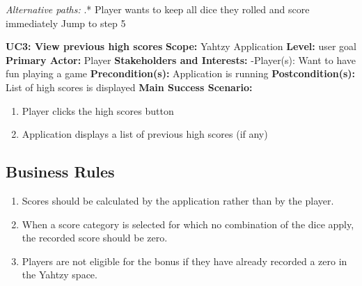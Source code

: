 \documentclass[12pt]{article}
\begin{document}
\begin{list}{}{}
\textit{Alternative paths:} \newline
{}.* Player wants to keep all dice they rolled and score immediately \newline
{} Jump to step 5 \newline

\newpage
\item \textbf{UC3: View previous high scores} \newline
\textbf{Scope:} Yahtzy Application \newline
\textbf{Level:} user goal \newline
\textbf{Primary Actor:} Player \newline
\textbf{Stakeholders and Interests:} \newline
\indent -Player(s): Want to have fun playing a game \newline
\textbf{Precondition(s):} Application is running \newline
\textbf{Postcondition(s):} List of high scores is displayed \newline \newline
\textbf{Main Success Scenario:}
\begin{enumerate}
\item Player clicks the high scores button
\item Application displays a list of previous high scores (if any)
\end{enumerate}

\end{list}

\subsection*{Business Rules}
\begin{enumerate}
\item Scores should be calculated by the application rather than by the player.
\item When a score category is selected for which no combination of the dice apply, the recorded score should be zero.
\item Players are not eligible for the bonus if they have already recorded a zero in the Yahtzy space.
\end{enumerate}
\end{document}
